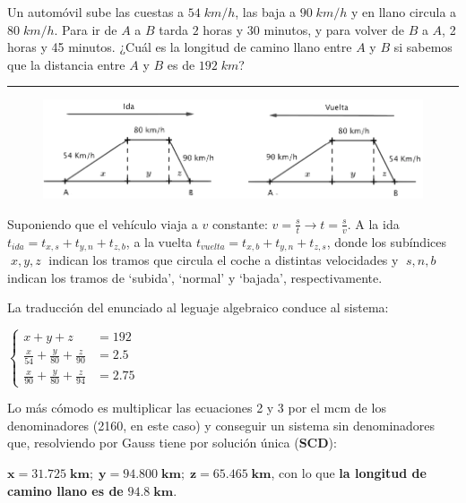 \vspace{5mm}
\begin{miejercicio}


Un automóvil sube las cuestas a $54\; km/h$, las baja a $90\; km/h$ y en llano circula a $80\;  km/h$. Para ir de $A$ a $B$ tarda $2$ horas y 30 minutos, y para volver de $B$ a $A$, 2 horas y 45 minutos. ¿Cuál es la longitud de camino llano entre $A$ y $B$ si sabemos que la distancia entre $A$ y $B$ es de $192\;  km$? 

\rule{250pt}{0.1pt}

\begin{figure}[H]
		\centering
		\includegraphics[width=.9\textwidth]{img-ecc/ecc06.png}
\end{figure}

\vspace{2mm} Suponiendo que el vehículo viaja a $v$ constante: $v=\frac s t \to t=\frac s v$. A la ida $t_{ida}=t_{x,s}+t_{y,n}+t_{z,b}$, a la vuelta $t_{vuelta}=t_{x,b}+t_{y,n}+t_{z,s}$, donde los subíndices $\; x,y,z\; $ indican los tramos que circula el coche a distintas velocidades y $\; s,n,b\; $ indican los tramos de `subida', `normal' y `bajada', respectivamente.
	
\vspace{2mm} La traducción del enunciado al leguaje algebraico conduce al sistema:
	
\vspace{2mm} $\begin{cases} x+y+z&=192\\ \frac{x}{54} + \frac{y}{80}+\frac{z}{90}&=2.5 \\ \frac{x}{90}+\frac{y}{80}+\frac{z}{94}&=2.75   \end{cases} \; \; $
	
\vspace{2mm} Lo más cómodo es multiplicar las ecuaciones 2 y 3 por el mcm de los denominadores (2160, en este caso) y conseguir un sistema sin denominadores que, resolviendo por Gauss tiene por solución única (\textbf{SCD}):
	
\vspace{2mm} $\boldsymbol{x=31.725 \; km; \; y= 94.800 \; km; \; z= 65.465 \; km}$, con lo que \textbf{la longitud de camino llano es de} $\boldsymbol{94.8 \; km}$.

\end{miejercicio}

